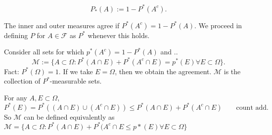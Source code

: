 \documentclass[class=article,crop=false]{standalone}
\begin{document}
\begin{defn}
\[
	P_*(A) := 1 - P^* (A^{c})
.\] 
\end{defn}

\begin{note}[]
	The inner and outer measures agree if $P^*(A^{c})=1-P^* (A)$. We proceed in defining $P$ for  $A \in \mathcal{F}$ as $P^* $ whenever this holds.
\end{note}

Consider all sets for which $p^* (A^{c})=1-P^* (A)$ and ..
\[
	\mathcal{M} := \{A \subset  \Omega: P^* (A \cap E) + P^* (A^{c} \cap E) = p^* (E) \forall  E \subset  \Omega\}
.\] 
Fact: $P^* (\Omega) = 1$.
If we take $E=\Omega$, then we obtain the agreement. $\mathcal{M}$ is the collection of $P^* $-measurable sets.

\begin{note}[]
For any $A,E \subset \Omega$, 
\[
	P^* (E) = P^* ((A \cap E) \cup (A^{c} \cap E))
	\leq P^* (A \cap E) + P^* (A^{c} \cap E) \qquad \text{count add} 
.\] 
So $\mathcal{M}$ can be defined equivalently as $\mathcal{M}=\{A \subset \Omega: P^* (A \cap E) + P^* (A^{c} \cap E \leq p*(E) \forall  E \subset  \Omega\}$
\end{note}
\end{document}
